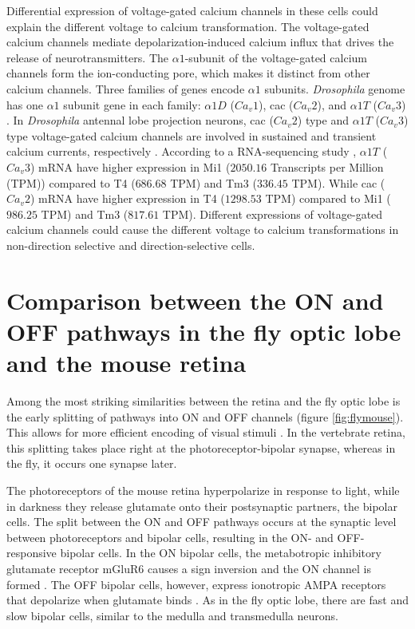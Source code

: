 Differential expression of voltage-gated calcium channels in these cells could explain the different voltage to calcium transformation. The voltage-gated calcium channels mediate depolarization-induced calcium influx that drives the release of neurotransmitters. The $\alpha1$-subunit of the voltage-gated calcium channels form the ion-conducting pore, which makes it distinct from other calcium channels. Three families of genes encode $\alpha1$ subunits. \textit{Drosophila} genome has one $\alpha1$ subunit gene in each family: $\alpha1D$ ($Ca_{v}1$), cac ($Ca_{v}2$), and $\alpha1T$ ($Ca_{v}3$) \parencite{Littleton2000, King2007}. In \textit{Drosophila} antennal lobe projection neurons, cac ($Ca_{v}2$) type and $\alpha1T$ ($Ca_{v}3$) type voltage-gated calcium channels are involved in sustained and transient calcium currents, respectively \parencite{Gu2009, Iniguez2013}. According to a RNA-sequencing study \parencite{Davis2020}, $\alpha1T$ ($Ca_{v}3$) mRNA have higher expression in Mi1 ($2050.16$ Transcripts per Million (TPM)) compared to T4 ($686.68$ TPM) and Tm3 ($336.45$ TPM). While cac ($Ca_{v}2$) mRNA have higher expression in T4 ($1298.53$ TPM) compared to Mi1 ($986.25$ TPM) and Tm3 ($817.61$ TPM). Different expressions of voltage-gated calcium channels could cause the different voltage to calcium transformations in non-direction selective and direction-selective cells.

\section{Comparison between the ON and OFF pathways in the fly optic lobe and the mouse retina}
Among the most striking similarities between the retina and the fly optic lobe is the early splitting of pathways into ON and OFF channels (figure \ref{fig:flymouse}). This allows for more efficient encoding of visual stimuli \parencite{Gjorgjieva2014}. In the vertebrate retina, this splitting takes place right at the photoreceptor-bipolar synapse, whereas in the fly, it occurs one synapse later.

The photoreceptors of the mouse retina hyperpolarize in response to light, while in darkness they release glutamate onto their postsynaptic partners, the bipolar cells. The split between the ON and OFF pathways occurs at the synaptic level between photoreceptors and bipolar cells, resulting in the ON- and OFF-responsive bipolar cells. In the ON bipolar cells, the metabotropic inhibitory glutamate receptor mGluR6 causes a sign inversion and the ON channel is formed \parencite{Masu1995}. The OFF bipolar cells, however, express ionotropic AMPA receptors that depolarize when glutamate binds \parencite{Euler2014}. As in the fly optic lobe, there are fast and slow bipolar cells, similar to the medulla and transmedulla neurons.

